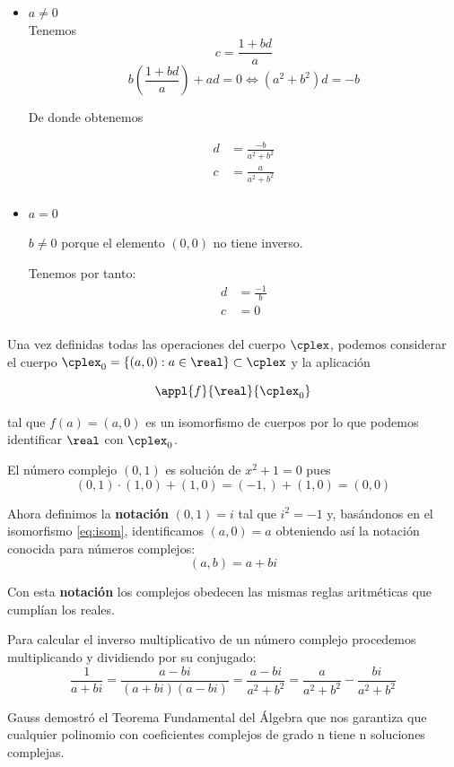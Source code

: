 \documentclass{apuntes}
\begin{document}
\begin{itemize}
\item \textbf{$a \neq 0$}\\

Tenemos
\[c = \frac{1+bd}{a} \]
\[b(\frac{1+bd}{a})+ad = 0 \iff (a^2+b^2)d = -b\]

De donde obtenemos

\begin{align*}
d & = \frac{-b}{a^2+b^2}\\
c & = \frac{a}{a^2+b^2}\\
\end{align*}

\item \textbf{$a=0$}

$b \neq 0$ porque el elemento $(0,0)$ no tiene inverso.

Tenemos por tanto:
\begin{align*}
d & = \frac{-1}{b}\\
c & = 0\\
\end{align*}
\end{itemize}

Una vez definidas todas las operaciones del cuerpo $\cplex$, podemos considerar el cuerpo $\cplex_0=\{(a,0): a \in \real\} \subset \cplex$ y la aplicación

\begin{equation} \label{eq:isom}
\appl{f}{\real}{\cplex_0}
\end{equation}

tal que $f(a)=(a,0)$ es un isomorfismo de cuerpos por lo que podemos identificar $\real$ con $\cplex_0$.

El número complejo $(0,1)$ es solución de $x^2+1=0$ pues
\[(0,1)\cdot(1,0)+(1,0)=(-1,)+(1,0)=(0,0)\]

Ahora definimos la \textbf{notación} $(0,1)=i$ tal que $i^2=-1$ y, basándonos en el isomorfismo \eqref{eq:isom}, identificamos $(a,0)=a$ obteniendo así la notación conocida para números complejos:
\[(a,b)=a+bi\]

Con esta \textbf{notación} los complejos obedecen las mismas reglas aritméticas que cumplían los reales.

Para calcular el inverso multiplicativo de un número complejo procedemos multiplicando y dividiendo por su conjugado:
\[\frac{1}{a+bi}=\frac{a-bi}{(a+bi)(a-bi)} = \frac{a-bi}{a^2+b^2} = \frac{a}{a^2+b^2}-\frac{bi}{a^2+b^2}\]

Gauss demostró el Teorema Fundamental del Álgebra que nos garantiza que cualquier polinomio con coeficientes complejos de grado n tiene n soluciones complejas.
\end{document}
